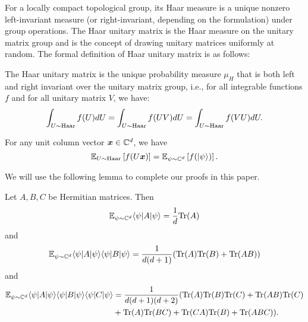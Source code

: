 For a locally compact topological group, its Haar measure is a unique nonzero left-invariant measure  (or right-invariant, depending on the formulation) under group operations. The Haar unitary matrix is the Haar measure on the unitary matrix group and is the concept of drawing unitary matrices uniformly at random. The formal definition of Haar unitary matrix is as follows:

\begin{definition}
    The Haar unitary matrix is the unique probability measure $\mu_{H}$ that is both left and right invariant over the unitary matrix group, i.e., for all integrable functions $f$ and for all unitary matrix $V$, we have:
    \begin{equation}
        \int_{U \sim \mathrm{Haar}}f(U)dU = \int_{U \sim \mathrm{Haar}}f(UV)dU = \int_{U \sim \mathrm{Haar}}f(VU)dU.
    \end{equation}
\end{definition}

For any unit column vector ${\boldsymbol x} \in \mathbb{C}^d$, we have 
\begin{equation}
    \mathbb{E}_{U \sim \mathrm{Haar}}\left[f(U{\boldsymbol x})\right] = \mathbb{E}_{\psi \sim \mathbb{C}^d}\left[f(|\psi\rangle)\right].
\end{equation}

We will use the following lemma to complete our proofs in this paper.

\begin{lemma}
    \label{lem:Haar_meausrement_expectation}
    Let $A,B,C$ be Hermitian matrices. Then
    \begin{equation}
        \mathbb{E}_{\psi \sim \mathbb{C}^d} \langle \psi| A | \psi \rangle = \frac{1}{d}\mathrm{Tr}(A)
    \end{equation}
    and
    \begin{equation}
        \mathbb{E}_{\psi \sim \mathbb{C}^d} \langle \psi| A | \psi \rangle \langle \psi| B | \psi \rangle = \frac{1}{d(d+1)}(\mathrm{Tr}(A)\mathrm{Tr}(B)+\mathrm{Tr}(AB))
    \end{equation}
    and
    \begin{equation}
        \begin{aligned}
            \mathbb{E}_{\psi \sim \mathbb{C}^d} \langle \psi| A | \psi \rangle \langle \psi| B | \psi \rangle \langle \psi| C | \psi \rangle & = \frac{1}{d(d+1)(d+2)}(\mathrm{Tr}(A)\mathrm{Tr}(B)\mathrm{Tr}(C)+\mathrm{Tr}(AB)\mathrm{Tr}(C) \\
            &+ \mathrm{Tr}(A)\mathrm{Tr}(BC) + \mathrm{Tr}(CA)\mathrm{Tr}(B) + \mathrm{Tr}(ABC)).
        \end{aligned}
    \end{equation}
\end{lemma}